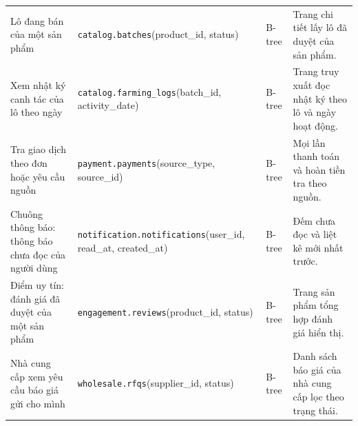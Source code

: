 \begin{longtable}{L{3.20cm} L{4.80cm} L{2.40cm} L{4.60cm}}
Lô đang bán của một sản phẩm & \texttt{catalog.\allowbreak{}batches}(\allowbreak{}product\_\allowbreak{}id, status) & B-tree & Trang chi tiết lấy lô đã duyệt của sản phẩm. \\
Xem nhật ký canh tác của lô theo ngày & \texttt{catalog.\allowbreak{}farming\_\allowbreak{}logs}(\allowbreak{}batch\_\allowbreak{}id, activity\_\allowbreak{}date) & B-tree & Trang truy xuất đọc nhật ký theo lô và ngày hoạt động. \\
Tra giao dịch theo đơn hoặc yêu cầu nguồn & \texttt{payment.\allowbreak{}payments}(\allowbreak{}source\_\allowbreak{}type, source\_\allowbreak{}id) & B-tree & Mọi lần thanh toán và hoàn tiền tra theo nguồn. \\
Chuông thông báo: thông báo chưa đọc của người dùng & \texttt{notification.\allowbreak{}notifications}(\allowbreak{}user\_\allowbreak{}id, read\_\allowbreak{}at, created\_\allowbreak{}at) & B-tree & Đếm chưa đọc và liệt kê mới nhất trước. \\
Điểm uy tín: đánh giá đã duyệt của một sản phẩm & \texttt{engagement.\allowbreak{}reviews}(\allowbreak{}product\_\allowbreak{}id, status) & B-tree & Trang sản phẩm tổng hợp đánh giá hiển thị. \\
Nhà cung cấp xem yêu cầu báo giá gửi cho mình & \texttt{wholesale.\allowbreak{}rfqs}(\allowbreak{}supplier\_\allowbreak{}id, status) & B-tree & Danh sách báo giá của nhà cung cấp lọc theo trạng thái. \\
\end{longtable}
\endgroup
